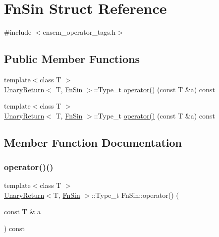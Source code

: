 \hypertarget{structFnSin}{}\section{Fn\+Sin Struct Reference}
\label{structFnSin}


{\ttfamily \#include $<$ensem\+\_\+operator\+\_\+tags.\+h$>$}

\subsection*{Public Member Functions}
\begin{DoxyCompactItemize}
\item 
{\footnotesize template$<$class T $>$ }\\\mbox{\hyperlink{structUnaryReturn}{Unary\+Return}}$<$ T, \mbox{\hyperlink{structFnSin}{Fn\+Sin}} $>$\+::Type\+\_\+t \mbox{\hyperlink{structFnSin_a6aa1709fd8bbba5ccb5a3cba4c5ad601}{operator()}} (const T \&a) const
\item 
{\footnotesize template$<$class T $>$ }\\\mbox{\hyperlink{structUnaryReturn}{Unary\+Return}}$<$ T, \mbox{\hyperlink{structFnSin}{Fn\+Sin}} $>$\+::Type\+\_\+t \mbox{\hyperlink{structFnSin_a6aa1709fd8bbba5ccb5a3cba4c5ad601}{operator()}} (const T \&a) const
\end{DoxyCompactItemize}


\subsection{Member Function Documentation}
\mbox{\label{structFnSin_a6aa1709fd8bbba5ccb5a3cba4c5ad601}} 
\subsubsection{\texorpdfstring{operator()()}{operator()()}\hspace{0.1cm}{\footnotesize\ttfamily [1/2]}}
{\footnotesize\ttfamily template$<$class T $>$ \\
\mbox{\hyperlink{structUnaryReturn}{Unary\+Return}}$<$T, \mbox{\hyperlink{structFnSin}{Fn\+Sin}} $>$\+::Type\+\_\+t Fn\+Sin\+::operator() (\begin{DoxyParamCaption}\item[{const T \&}]{a }\end{DoxyParamCaption}) const\hspace{0.3cm}{\ttfamily [inline]}}

